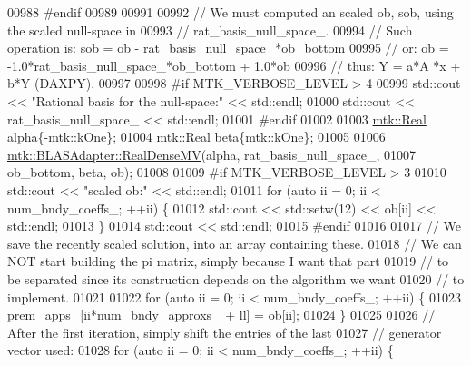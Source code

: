 \begin{DoxyCode}
{{00988 \textcolor{preprocessor}{    #endif}
00989 
00991 
00992     \textcolor{comment}{// We must computed an scaled ob, sob, using the scaled null-space in}
00993     \textcolor{comment}{// rat\_basis\_null\_space\_.}
00994     \textcolor{comment}{// Such operation is: sob = ob - rat\_basis\_null\_space\_*ob\_bottom}
00995     \textcolor{comment}{// or:                 ob = -1.0*rat\_basis\_null\_space\_*ob\_bottom + 1.0*ob}
00996     \textcolor{comment}{// thus:                Y =    a*A    *x         +   b*Y (DAXPY).}
00997 
00998 \textcolor{preprocessor}{    #if MTK\_VERBOSE\_LEVEL > 4}
00999     std::cout << \textcolor{stringliteral}{"Rational basis for the null-space:"} << std::endl;
01000     std::cout << rat\_basis\_null\_space\_ << std::endl;
01001 \textcolor{preprocessor}{    #endif}
01002 
01003     \hyperlink{group__c01-roots_gac080bbbf5cbb5502c9f00405f894857d}{mtk::Real} alpha\{-\hyperlink{group__c01-roots_ga26407c24d43b6b95480943340d285c71}{mtk::kOne}\};
01004     \hyperlink{group__c01-roots_gac080bbbf5cbb5502c9f00405f894857d}{mtk::Real} beta\{\hyperlink{group__c01-roots_ga26407c24d43b6b95480943340d285c71}{mtk::kOne}\};
01005 
01006     \hyperlink{classmtk_1_1BLASAdapter_afdcac059a4294287cb55638221220646}{mtk::BLASAdapter::RealDenseMV}(alpha, rat\_basis\_null\_space\_,
01007                                   ob\_bottom, beta, ob);
01008 
01009 \textcolor{preprocessor}{    #if MTK\_VERBOSE\_LEVEL > 3}
01010     std::cout << \textcolor{stringliteral}{"scaled ob:"} << std::endl;
01011     \textcolor{keywordflow}{for} (\textcolor{keyword}{auto} ii = 0; ii < num\_bndy\_coeffs\_; ++ii) \{
01012       std::cout << std::setw(12) << ob[ii] << std::endl;
01013     \}
01014     std::cout << std::endl;
01015 \textcolor{preprocessor}{    #endif}
01016 
01017     \textcolor{comment}{// We save the recently scaled solution, into an array containing these.}
01018     \textcolor{comment}{// We can NOT start building the pi matrix, simply because I want that part}
01019     \textcolor{comment}{// to be separated since its construction depends on the algorithm we want}
01020     \textcolor{comment}{// to implement.}
01021 
01022     \textcolor{keywordflow}{for} (\textcolor{keyword}{auto} ii = 0; ii < num\_bndy\_coeffs\_; ++ii) \{
01023       prem\_apps\_[ii*num\_bndy\_approxs\_ + ll] = ob[ii];
01024     \}
01025 
01026     \textcolor{comment}{// After the first iteration, simply shift the entries of the last}
01027     \textcolor{comment}{// generator vector used:}
01028     \textcolor{keywordflow}{for} (\textcolor{keyword}{auto} ii = 0; ii < num\_bndy\_coeffs\_; ++ii) \{
}}
\end{DoxyCode}
